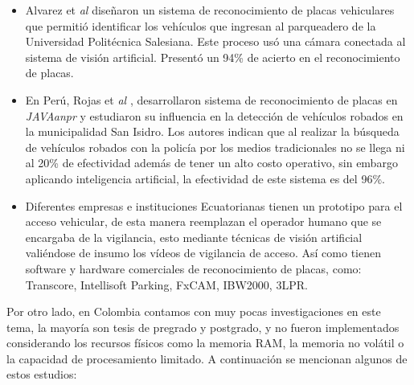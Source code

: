 \begin{itemize}
    \item Alvarez et \textit{al} \cite{alvarez2014analisis} diseñaron un sistema de reconocimiento de placas vehiculares que permitió identificar los vehículos que ingresan al parqueadero de la Universidad Politécnica Salesiana. Este proceso usó una cámara conectada al sistema de visión artificial. Presentó un 94\% de acierto en el reconocimiento de placas.
    \item En Perú, Rojas et \textit{al} \cite{rojas2017desarrollo}, desarrollaron sistema de reconocimiento de placas en \textit{JAVAanpr} y estudiaron su influencia en la detección de vehículos robados en la municipalidad San Isidro. Los autores indican que al realizar la búsqueda de vehículos robados con la policía por los medios tradicionales no se llega ni al 20\% de efectividad además de tener un alto costo operativo, sin embargo aplicando inteligencia artificial, la efectividad de este sistema es del 96\%. 
    \item Diferentes empresas e instituciones Ecuatorianas tienen un prototipo para el acceso vehicular, de esta manera reemplazan el operador humano que se encargaba de la vigilancia, esto mediante técnicas de visión artificial valiéndose de insumo los vídeos de vigilancia de acceso. Así como tienen software y hardware comerciales de reconocimiento de placas, como: Transcore, Intellisoft Parking, FxCAM, IBW2000, 3LPR.
\end{itemize}

Por otro lado, en Colombia contamos con muy pocas investigaciones en este tema, la mayoría son tesis de pregrado y postgrado, y no fueron implementados considerando los recursos físicos como la memoria RAM, la memoria no volátil o la capacidad de procesamiento limitado. A continuación se mencionan algunos de estos estudios: 

